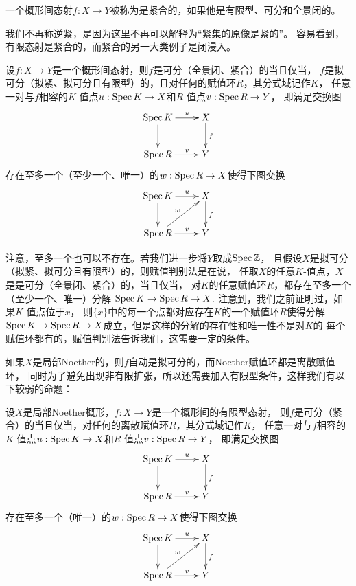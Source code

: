 \begin{para}[紧合性]
	一个概形间态射$f:X\to Y$被称为是紧合的，如果他是有限型、可分和全景闭的。
\end{para}

我们不再称逆紧，是因为这里不再可以解释为“紧集的原像是紧的”。
容易看到，有限态射是紧合的，而紧合的另一大类例子是闭浸入。

\begin{thm}[赋值判别法]
	设$f:X\to Y$是一个概形间态射，则$f$是可分（全景闭、紧合）的当且仅当，
	$f$是拟可分（拟紧、拟可分且有限型）的，且对任何的赋值环$R$，其分式域记作$K$，
	任意一对与$f$相容的$K$-值点$u:\operatorname{Spec} K\to X$和$R$-值点$v:\operatorname{Spec} R\to Y$，
	即满足交换图
	\[
		\xymatrix{
			\spec K\ar[r]^-u\ar[d] & X\ar[d]^f\\
			\spec R\ar[r]^-{v} & Y
		}
	\]
	存在至多一个（至少一个、唯一）的$w:\operatorname{Spec} R\to X$使得下图交换
	\[
		\xymatrix{
			\spec K\ar[r]^-u\ar[d] & X\ar[d]^f\\
			\spec R\ar[ru]^w\ar[r]^-{v} & Y
		}
	\]
\end{thm}

注意，至多一个也可以不存在。若我们进一步将$Y$取成$\operatorname{Spec} \mathbb Z$，
且假设$X$是拟可分（拟紧、拟可分且有限型）的，则赋值判别法是在说，
任取$X$的任意$K$-值点，$X$是是可分（全景闭、紧合）的，当且仅当，
对$K$的任意赋值环$R$，都存在至多一个（至少一个、唯一）分解
$\operatorname{Spec} K\to \operatorname{Spec} R\to X$. 注意到，我们之前证明过，如果$K$-值点位于$x$，
则$\overline{\{x\}}$中的每一个点都对应存在$K$的一个赋值环$R$使得分解
$\operatorname{Spec} K\to \operatorname{Spec} R\to X$成立，但是这样的分解的存在性和唯一性不是对$K$的
每个赋值环都有的，赋值判别法告诉我们，这需要一定的条件。

如果$X$是局部Noether的，则$f$自动是拟可分的，而Noether赋值环都是离散赋值环，
同时为了避免出现非有限扩张，所以还需要加入有限型条件，这样我们有以下较弱的命题：

\begin{thm}[赋值判别法]
	设$X$是局部Noether概形，$f:X\to Y$是一个概形间的有限型态射，
	则$f$是可分（紧合）的当且仅当，对任何的离散赋值环$R$，其分式域记作$K$，
	任意一对与$f$相容的$K$-值点$u:\operatorname{Spec} K\to X$和$R$-值点$v:\operatorname{Spec} R\to Y$，
	即满足交换图
	\[
		\xymatrix{
			\spec K\ar[r]^-u\ar[d] & X\ar[d]^f\\
			\spec R\ar[r]^-{v} & Y
		}
	\]
	存在至多一个（唯一）的$w:\operatorname{Spec} R\to X$使得下图交换
	\[
		\xymatrix{
			\spec K\ar[r]^-u\ar[d] & X\ar[d]^f\\
			\spec R\ar[ru]^w\ar[r]^-{v} & Y
		}
	\]
\end{thm}


